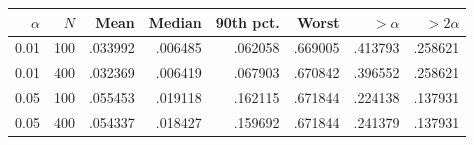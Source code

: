 \begin{tabular}{rrrrrrrr}
\toprule
$\alpha$ & $N$ & Mean & Median & 90th pct. & Worst & $>\alpha$ & $>2\alpha$\\
\midrule
0.01 & 100 & .033992 & .006485 & .062058 & .669005 & .413793 & .258621\\
0.01 & 400 & .032369 & .006419 & .067903 & .670842 & .396552 & .258621\\
0.05 & 100 & .055453 & .019118 & .162115 & .671844 & .224138 & .137931\\
0.05 & 400 & .054337 & .018427 & .159692 & .671844 & .241379 & .137931\\
\bottomrule
\end{tabular}
